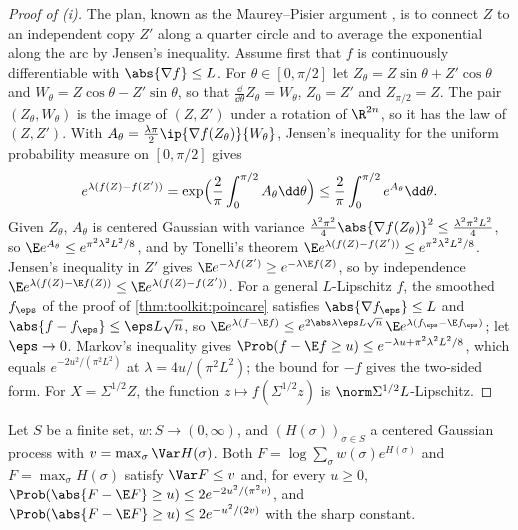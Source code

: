 \begin{refsection}
\begin{proof}[Proof of (i)]
The plan, known as the Maurey--Pisier argument \parencite{Pisier1986}, is to connect $Z$ to an independent copy $Z'$ along a quarter circle and to average the exponential along the arc by Jensen's inequality. Assume first that $f$ is continuously differentiable with $\abs{\nabla f}\le L$. For $\theta\in[0,\pi/2]$ let $Z_\theta=Z\sin\theta+Z'\cos\theta$ and $W_\theta=Z\cos\theta-Z'\sin\theta$, so that $\frac{\dd}{\dd\theta}Z_\theta=W_\theta$, $Z_0=Z'$ and $Z_{\pi/2}=Z$. The pair $(Z_\theta,W_\theta)$ is the image of $(Z,Z')$ under a rotation of $\R^{2n}$, so it has the law of $(Z,Z')$. With $A_\theta=\frac{\lambda\pi}2\ip{\nabla f(Z_\theta)}{W_\theta}$, Jensen's inequality for the uniform probability measure on $[0,\pi/2]$ gives
\[
e^{\lambda(f(Z)-f(Z'))}=\exp\Bigl(\frac2\pi\int_0^{\pi/2}A_\theta\dd\theta\Bigr)\le\frac2\pi\int_0^{\pi/2}e^{A_\theta}\dd\theta.
\]
Given $Z_\theta$, $A_\theta$ is centered Gaussian with variance $\frac{\lambda^2\pi^2}4\abs{\nabla f(Z_\theta)}^2\le\frac{\lambda^2\pi^2L^2}4$, so $\E e^{A_\theta}\le e^{\pi^2\lambda^2L^2/8}$, and by Tonelli's theorem $\E e^{\lambda(f(Z)-f(Z'))}\le e^{\pi^2\lambda^2L^2/8}$. Jensen's inequality in $Z'$ gives $\E e^{-\lambda f(Z')}\ge e^{-\lambda\E f(Z)}$, so by independence $\E e^{\lambda(f(Z)-\E f(Z))}\le\E e^{\lambda(f(Z)-f(Z'))}$. For a general $L$-Lipschitz $f$, the smoothed $f_\eps$ of the proof of \cref{thm:toolkit:poincare} satisfies $\abs{\nabla f_\eps}\le L$ and $\abs{f-f_\eps}\le\eps L\sqrt n$, so $\E e^{\lambda(f-\E f)}\le e^{2\abs\lambda\eps L\sqrt n}\,\E e^{\lambda(f_\eps-\E f_\eps)}$; let $\eps\to0$. Markov's inequality gives $\Prob(f-\E f\ge u)\le e^{-\lambda u+\pi^2\lambda^2L^2/8}$, which equals $e^{-2u^2/(\pi^2L^2)}$ at $\lambda=4u/(\pi^2L^2)$; the bound for $-f$ gives the two-sided form. For $X=\Sigma^{1/2}Z$, the function $z\mapsto f(\Sigma^{1/2}z)$ is $\norm\Sigma^{1/2}L$-Lipschitz.
\end{proof}

\begin{corollary}\label{cor:toolkit:freeentropy}
Let $S$ be a finite set, $w\colon S\to(0,\infty)$, and $(H(\sigma))_{\sigma\in S}$ a centered Gaussian process with $v=\max_\sigma\Var H(\sigma)$. Both $F=\log\sum_\sigma w(\sigma)e^{H(\sigma)}$ and $F=\max_\sigma H(\sigma)$ satisfy $\Var F\le v$ and, for every $u\ge0$, $\Prob(\abs{F-\E F}\ge u)\le2e^{-2u^2/(\pi^2v)}$, and $\Prob(\abs{F-\E F}\ge u)\le2e^{-u^2/(2v)}$ with the sharp constant.
\end{corollary}


\end{refsection}
